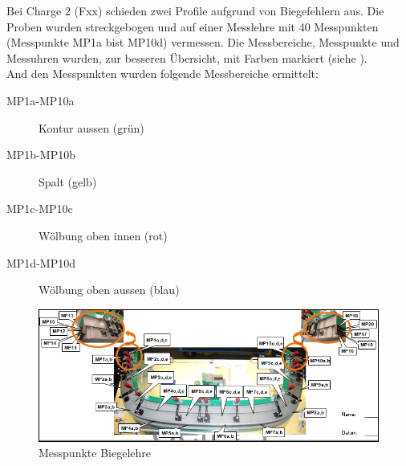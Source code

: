 \documentclass[12pt,a4paper,parskip]{scrartcl}
\begin{document}
{ Bei Charge 2 (Fxx) schieden zwei Profile aufgrund von Biegefehlern aus. Die Proben wurden streckgebogen und auf einer Messlehre  mit 40 Messpunkten (Messpunkte MP1a bist MP10d) vermessen. Die Messbereiche, Messpunkte und Messuhren wurden, zur besseren Übersicht, mit Farben markiert (siehe ).  \\
 And den Messpunkten wurden folgende Messbereiche ermittelt:
 \begin{description}
 \item[MP1a-MP10a] Kontur aussen (grün)
 \item[MP1b-MP10b] Spalt (gelb)
 \item[MP1c-MP10c] Wölbung oben innen (rot)
 \item[MP1d-MP10d] Wölbung oben aussen (blau)
 \end{description}
\begin{figure}[!htb]
\centering
\includegraphics[width=1\linewidth,height=.2\textheight]{messpunktevdkda3}
\caption{Messpunkte Biegelehre}
\label{fig:messpunktevdkda3}
\end{figure} 
 
 
 
}
\end{document}
